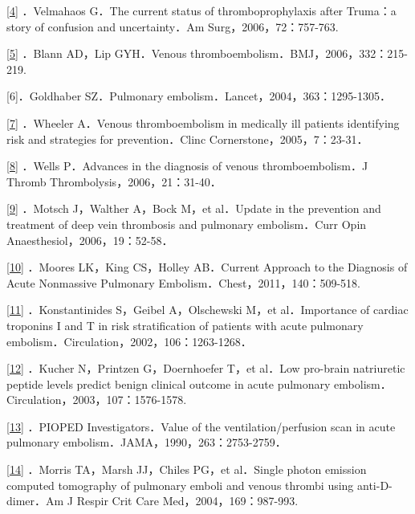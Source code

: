 \protect\hyperlink{text00022.htmlux5cux23ch4-21-back}{{[}4{]}}
．Velmahaos G．The current status of thromboprophylaxis after Truma：a
story of confusion and uncertainty．Am Surg，2006，72：757-763.

\protect\hyperlink{text00022.htmlux5cux23ch5-21-back}{{[}5{]}} ．Blann
AD，Lip GYH．Venous thromboembolism．BMJ，2006，332：215-219.

{[}6{]}．Goldhaber SZ．Pulmonary
embolism．Lancet，2004，363：1295-1305．

\protect\hyperlink{text00022.htmlux5cux23ch7-21-back}{{[}7{]}} ．Wheeler
A．Venous thromboembolism in medically ill patients identifying risk and
strategies for prevention．Clinc Cornerstone，2005，7：23-31．

\protect\hyperlink{text00022.htmlux5cux23ch8-21-back}{{[}8{]}} ．Wells
P．Advances in the diagnosis of venous thromboembolism．J Thromb
Thrombolysis，2006，21：31-40．

\protect\hyperlink{text00022.htmlux5cux23ch9-21-back}{{[}9{]}} ．Motsch
J，Walther A，Bock M，et al．Update in the prevention and treatment of
deep vein thrombosis and pulmonary embolism．Curr Opin
Anaesthesiol，2006，19：52-58．

\protect\hyperlink{text00022.htmlux5cux23ch10-21-back}{{[}10{]}}
．Moores LK，King CS，Holley AB．Current Approach to the Diagnosis of
Acute Nonmassive Pulmonary Embolism．Chest，2011，140：509-518.

\protect\hyperlink{text00022.htmlux5cux23ch11-21-back}{{[}11{]}}
．Konstantinides S，Geibel A，Olschewski M，et al．Importance of cardiac
troponins I and T in risk stratification of patients with acute
pulmonary embolism．Circulation，2002，106：1263-1268．

\protect\hyperlink{text00022.htmlux5cux23ch12-21-back}{{[}12{]}}
．Kucher N，Printzen G，Doernhoefer T，et al．Low pro-brain natriuretic
peptide levels predict benign clinical outcome in acute pulmonary
embolism．Circulation，2003，107：1576-1578.

\protect\hyperlink{text00022.htmlux5cux23ch13-21-back}{{[}13{]}}
．PIOPED Investigators．Value of the ventilation/perfusion scan in acute
pulmonary embolism．JAMA，1990，263：2753-2759．

\protect\hyperlink{text00022.htmlux5cux23ch14-21-back}{{[}14{]}}
．Morris TA，Marsh JJ，Chiles PG，et al．Single photon emission computed
tomography of pulmonary emboli and venous thrombi using anti-D-dimer．Am
J Respir Crit Care Med，2004，169：987-993.

